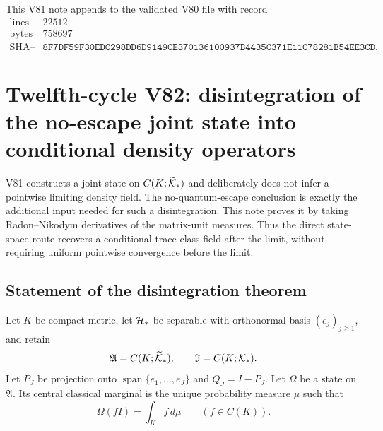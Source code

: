 \documentclass[11pt]{article}
\theoremstyle{remark}
\begin{document}
This V81 note appends to the validated V80 file with record
\[
\begin{array}{c|c}
\text{lines}&22512\\
\text{bytes}&758697\\
\text{SHA--256}&
\texttt{8F7DF59F30EDC298DD6D9149CE370136100937B4435C371E11C78281B54EE3CD}.
\end{array}
\]



\section{Twelfth-cycle V82: disintegration of the no-escape joint
state into conditional density operators}
\label{sec:v12v82}

V81 constructs a joint state on
\(C(K;\widetilde{\cal K}_*)\) and deliberately does not infer a
pointwise limiting density field.  The no-quantum-escape conclusion
is exactly the additional input needed for such a disintegration.
This note proves it by taking Radon--Nikodym derivatives of the
matrix-unit measures.  Thus the direct state-space route recovers a
conditional trace-class field after the limit, without requiring
uniform pointwise convergence before the limit.

\subsection{Statement of the disintegration theorem}

Let \(K\) be compact metric, let \({\cal H}_*\) be separable with
orthonormal basis \((e_j)_{j\geq1}\), and retain
\[
 {\mathfrak A}=C(K;\widetilde{\cal K}_*),\qquad
 {\mathfrak I}=C(K;{\cal K}_*).
\]
Let \(P_J\) be projection onto
\(\operatorname{span}\{e_1,\ldots,e_J\}\) and \(Q_J=I-P_J\).
Let \(\Omega\) be a state on \({\mathfrak A}\).  Its central
classical marginal is the unique probability measure \(\mu\) such
that
\begin{equation}
                         \Omega(fI)=\int_Kf\,d\mu
                         \qquad(f\in C(K)).                  \tag{82.1}
\end{equation}
\end{document}
